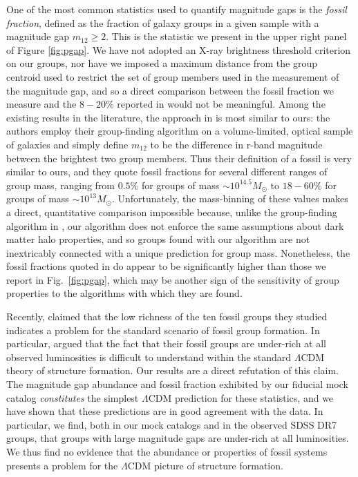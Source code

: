 \documentclass[usenatbib,usegraphicx,letterpaper]{mn2e}
\newcommand{\monetwo}{m_{12}}
\newcommand{\msun}{M_\odot}
\newcommand{\lcdm}{\Lambda\mathrm{CDM}}
\begin{document}
One of the most common statistics used to quantify magnitude gaps is
the {\em fossil fraction}, defined as the fraction of galaxy groups in
a given sample with a magnitude gap $\monetwo \geq 2$.  This is the
statistic we present in the upper right panel of Figure
\ref{fig:pgap}. We have not adopted an X-ray brightness threshold
criterion on our groups, nor have we imposed a maximum distance from
the group centroid used to restrict the set of group members used in
the measurement of the magnitude gap, and so a direct comparison
between the fossil fraction we measure and the $8-20\%$ reported in
\citet{jones_etal03} would not be meaningful. Among the existing
results in the literature, the approach in \citet{yang_etal08} is most
similar to ours: the authors employ their group-finding algorithm on a
volume-limited, optical sample of galaxies and simply define
$\monetwo$ to be the difference in r-band magnitude between the
brightest two group members. Thus their definition of a fossil is very
similar to ours, and they quote fossil fractions for several different
ranges of group mass, ranging from $0.5\%$ for groups of mass
$\sim10^{14.5}\msun$ to $18-60\%$ for groups of mass
$\sim10^{13}\msun.$ Unfortunately, the mass-binning of these values
makes a direct, quantitative comparison impossible because, unlike the
group-finding algorithm in \citet{yang_etal08}, our algorithm does not
enforce the same assumptions about dark matter halo properties, 
and so groups found with our algorithm are not
inextricably connected with a unique prediction for group
mass. Nonetheless, the fossil fractions quoted in \citet{yang_etal08}
do appear to be significantly higher than those we report in
Fig.~\ref{fig:pgap}, which may be another sign of the sensitivity of
group properties to the algorithms with which they are found. 


Recently, \citet{proctor_etal11} claimed that the low richness of the
ten fossil groups they studied indicates a problem for the standard
scenario of fossil group formation. In particular, \citet{proctor_etal11} 
argued that the fact that their fossil groups are under-rich at all 
observed luminosities is difficult to understand within the standard 
$\lcdm$ theory of structure formation.  Our results are a direct
refutation of this claim. The magnitude gap abundance and fossil
fraction exhibited by our fiducial mock catalog {\em constitutes} the
simplest $\lcdm$ prediction for these statistics, and we have shown that 
these predictions are in good agreement with the data. In particular, 
we find, both in our mock catalogs and in the observed SDSS DR7 groups, 
that groups with large magnitude gaps are under-rich at all luminosities. 
We thus find no evidence that the abundance or properties of fossil systems 
presents a problem for the $\lcdm$ picture of structure formation.
\end{document}
